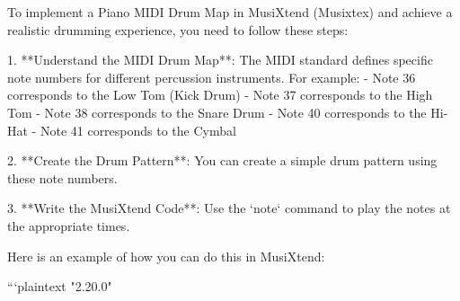 To implement a Piano MIDI Drum Map in MusiXtend (Musixtex) and achieve a realistic drumming experience, you need to follow these steps:

1. **Understand the MIDI Drum Map**: The MIDI standard defines specific note numbers for different percussion instruments. For example:
   - Note 36 corresponds to the Low Tom (Kick Drum)
   - Note 37 corresponds to the High Tom
   - Note 38 corresponds to the Snare Drum
   - Note 40 corresponds to the Hi-Hat
   - Note 41 corresponds to the Cymbal

2. **Create the Drum Pattern**: You can create a simple drum pattern using these note numbers.

3. **Write the MusiXtend Code**: Use the `note` command to play the notes at the appropriate times.

Here is an example of how you can do this in MusiXtend:

```plaintext
\version "2.20.0"


